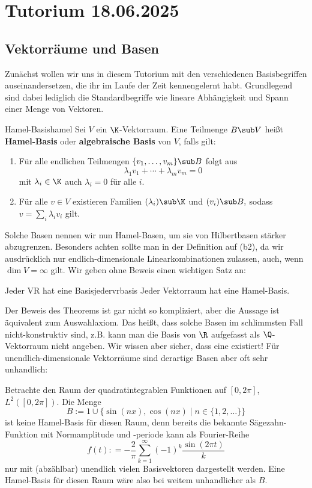 \section{Tutorium 18.06.2025}
\label{sec:18_06_25}

\subsection{Vektorräume und Basen}
\label{subsec:vekbas}

Zunächst wollen wir uns in diesem Tutorium mit den verschiedenen Basisbegriffen auseinandersetzen, die ihr im Laufe der Zeit kennengelernt habt.
Grundlegend sind dabei lediglich die Standardbegriffe wie lineare Abhängigkeit und Spann einer Menge von Vektoren.

\begin{definition}{Hamel-Basis}{hamel}
    Sei $V$ ein $\K$-Vektorraum. Eine Teilmenge $B \sub V$ heißt \textbf{Hamel-Basis} oder \textbf{algebraische Basis} von $V$, falls gilt:
    \begin{enumerate}[({b}1)]
        \item Für alle endlichen Teilmengen $\{v_1, \dots, v_m\} \sub B$ folgt aus 
        \[\lambda_1 v_1 + \cdots + \lambda_m v_m = 0\] mit $\lambda_i \in \K$ auch $\lambda_i = 0$ für alle $i$.
        \item Für alle $v \in V$ existieren  Familien $(\lambda_i) \sub \K$ und $(v_i) \sub B,$ sodass $v = \sum_i \lambda_i v_i$ gilt.
    \end{enumerate}
\end{definition}
Solche Basen nennen wir nun Hamel-Basen, um sie von Hilbertbasen stärker abzugrenzen. Besonders achten sollte man in der Definition auf (b2), da wir ausdrücklich nur endlich-dimensionale Linearkombinationen zulassen, auch, wenn $\dim V = \infty$ gilt. Wir geben ohne Beweis einen wichtigen Satz an:
\begin{theorem}{Jeder VR hat eine Basis}{jedervrbasis}
Jeder Vektorraum hat eine Hamel-Basis.
\end{theorem}
Der Beweis des Theorems ist gar nicht so kompliziert, aber die Aussage ist äquivalent zum Auswahlaxiom. Das heißt, dass solche Basen im schlimmsten Fall nicht-konstruktiv sind, z.B. kann man die Basis von $\R$ aufgefasst als $\Q$-Vektorraum nicht angeben. Wir wissen aber sicher, dass eine existiert!
Für unendlich-dimensionale Vektorräume sind derartige Basen aber oft sehr unhandlich:
\begin{beispiel}
Betrachte den Raum der quadratintegrablen Funktionen auf $[0, 2\pi]$, $L^2([0,2\pi])$. Die Menge $$B:= 1 \cup \{ \sin(nx), \cos(nx) \mid n \in \{1,2, \dots\} \}$$ ist keine Hamel-Basis für diesen Raum, denn bereits die bekannte Sägezahn-Funktion mit Normamplitude und -periode kann als Fourier-Reihe
\begin{equation}
f(t) : = -\frac{2}{\pi} \sum_{k=1}^\infty (-1)^k \frac{\sin (2\pi t)}{k}
\end{equation}
nur mit (abzählbar) unendlich vielen Basisvektoren dargestellt werden. Eine Hamel-Basis für diesen Raum wäre also bei weitem unhandlicher als $B$.
\end{beispiel}
